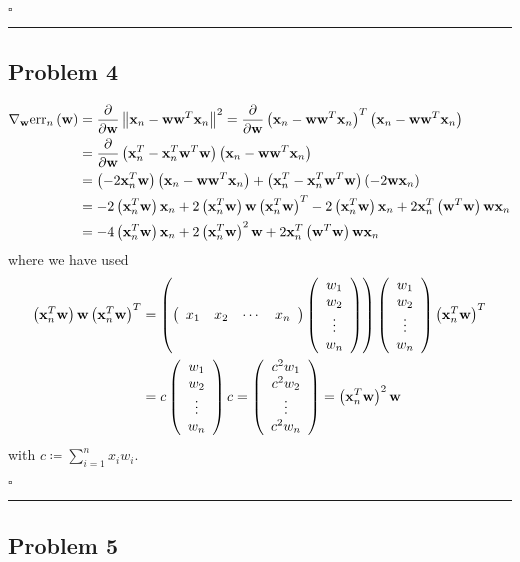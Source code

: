 \documentclass[12pt]{article}
\newcommand*{\QEDB}{\hfill\ensuremath{\square}}
\newcommand{\ParTh}[1]{\left(#1\right)}
\newcommand{\BF}[1]{{\bf#1}}
\newcommand{\VecAbsVal}[1]{\left\|#1\right\|}
\newcommand{\Matrix}[2]{\ParTh{\begin{array}{#1}#2\end{array}}}
\newcommand{\horrule}[1]{\rule{\linewidth}{#1}}
\begin{document}
\QEDB

\horrule{0.5pt}

\subsection*{Problem 4}

\begin{align}
\nabla_{\BF{w}}\text{err}_n\ParTh{\BF{w}}&=\dfrac{\partial}{\partial\BF{w}}\VecAbsVal{\BF{x}_n-\BF{w}\BF{w}^T\BF{x}_n}^2=\dfrac{\partial}{\partial\BF{w}}\ParTh{\BF{x}_n-\BF{w}\BF{w}^T\BF{x}_n}^T\ParTh{\BF{x}_n-\BF{w}\BF{w}^T\BF{x}_n}\\
&=\dfrac{\partial}{\partial\BF{w}}\ParTh{\BF{x}^T_n-\BF{x}^T_n\BF{w}^T\BF{w}}\ParTh{\BF{x}_n-\BF{w}\BF{w}^T\BF{x}_n}\\
&=\ParTh{-2\BF{x}^T_n\BF{w}}\ParTh{\BF{x}_n-\BF{w}\BF{w}^T\BF{x}_n}+\ParTh{\BF{x}^T_n-\BF{x}^T_n\BF{w}^T\BF{w}}\ParTh{-2\BF{w}\BF{x}_n}\\
&=-2\ParTh{\BF{x}^T_n\BF{w}}\BF{x}_n+2\ParTh{\BF{x}^T_n\BF{w}}\BF{w}\ParTh{\BF{x}^T_n\BF{w}}^T-2\ParTh{\BF{x}^T_n\BF{w}}\BF{x}_n+2\BF{x}^T_n\ParTh{\BF{w}^T\BF{w}}\BF{w}\BF{x}_n\\
&=-4\ParTh{\BF{x}^T_n\BF{w}}\BF{x}_n+2\ParTh{\BF{x}^T_n\BF{w}}^2\BF{w}+2\BF{x}^T_n\ParTh{\BF{w}^T\BF{w}}\BF{w}\BF{x}_n
\end{align}
where we have used
\begin{align}
\ParTh{\BF{x}^T_n\BF{w}}\BF{w}\ParTh{\BF{x}^T_n\BF{w}}^T&=\ParTh{\Matrix{cccc}{x_1&x_2&\cdots&x_n}\Matrix{c}{w_{1}\\w_{2}\\\vdots\\w_{n}}}\Matrix{c}{w_{1}\\w_{2}\\\vdots\\w_{n}}\ParTh{\BF{x}^T_n\BF{w}}^T\\
&=c\Matrix{c}{w_{1}\\w_{2}\\\vdots\\w_{n}}c=\Matrix{c}{c^2w_{1}\\c^2w_{2}\\\vdots\\c^2w_{n}}=\ParTh{\BF{x}^T_n\BF{w}}^2\BF{w}
\end{align}
with $c\coloneqq\sum_{i=1}^{n}x_iw_i$.

\QEDB

\horrule{0.5pt}

\subsection*{Problem 5}
\end{document}

